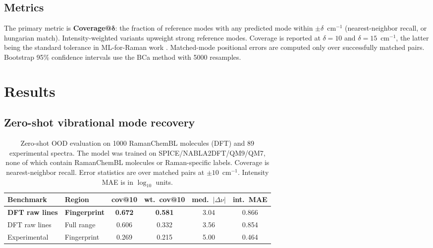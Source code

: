 \documentclass[10pt]{article}
\begin{document}
\subsection{Metrics}

The primary metric is \textbf{Coverage@$\bm{\delta}$}: the fraction of reference modes with any predicted mode within $\pm\delta$~cm$^{-1}$ (nearest-neighbor recall, or hungarian match). Intensity-weighted variants upweight strong reference modes. Coverage is reported at $\delta = 10$ and $\delta = 15$~cm$^{-1}$, the latter being the standard tolerance in ML-for-Raman work \citep{COVERAGE}. Matched-mode positional errors are computed only over successfully matched pairs. Bootstrap 95\% confidence intervals use the BCa method with 5000 resamples.

\section{Results}
\label{sec:results}

\subsection{Zero-shot vibrational mode recovery}

\begin{table}[t]
\centering
\small
\begin{tabular}{llcccc}
\toprule
Benchmark & Region & cov@10 & wt.\ cov@10 & med.\ $|\Delta\nu|$ & int.\ MAE \\
\midrule
\textbf{DFT raw lines} & \textbf{Fingerprint} & \textbf{0.672} & \textbf{0.581} & 3.04 & 0.866 \\
DFT raw lines & Full range & 0.606 & 0.332 & 3.56 & 0.854 \\
\midrule
Experimental & Fingerprint & 0.269 & 0.215 & 5.00 & 0.464 \\
\bottomrule
\end{tabular}
\caption{Zero-shot OOD evaluation on 1000 RamanChemBL molecules (DFT) and 89 experimental spectra. The model was trained on SPICE/NABLA2DFT/QM9/QM7, none of which contain RamanChemBL molecules or Raman-specific labels. Coverage is nearest-neighbor recall. Error statistics are over matched pairs at $\pm 10$~cm$^{-1}$. Intensity MAE is in $\log_{10}$ units.}
\label{tab:core-metrics}
\end{table}
\end{document}
